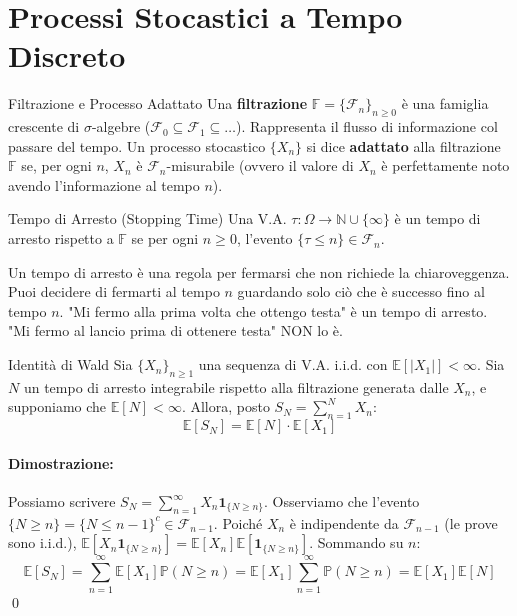 \documentclass[11pt,a4paper]{article}
\begin{document}
\newpage
\section{Processi Stocastici a Tempo Discreto}

\begin{definizione}{Filtrazione e Processo Adattato}{}
Una \textbf{filtrazione} $\mathbb{F} = \{\mathcal{F}_n\}_{n \ge 0}$ è una famiglia crescente di $\sigma$-algebre ($\mathcal{F}_0 \subseteq \mathcal{F}_1 \subseteq \dots$). Rappresenta il flusso di informazione col passare del tempo.
Un processo stocastico $\{X_n\}$ si dice \textbf{adattato} alla filtrazione $\mathbb{F}$ se, per ogni $n$, $X_n$ è $\mathcal{F}_n$-misurabile (ovvero il valore di $X_n$ è perfettamente noto avendo l'informazione al tempo $n$).
\end{definizione}

\begin{definizione}{Tempo di Arresto (Stopping Time)}{}
Una V.A. $\tau: \Omega \to \mathbb{N} \cup \{\infty\}$ è un tempo di arresto rispetto a $\mathbb{F}$ se per ogni $n \ge 0$, l'evento $\{\tau \le n\} \in \mathcal{F}_n$.
\end{definizione}
\begin{intuizione}
Un tempo di arresto è una regola per fermarsi che non richiede la chiaroveggenza. Puoi decidere di fermarti al tempo $n$ guardando solo ciò che è successo fino al tempo $n$. "Mi fermo alla prima volta che ottengo testa" è un tempo di arresto. "Mi fermo al lancio prima di ottenere testa" NON lo è.
\end{intuizione}

\begin{teorema}{Identità di Wald}{}
Sia $\{X_n\}_{n \ge 1}$ una sequenza di V.A. i.i.d. con $\mathbb{E}[|X_1|] < \infty$. Sia $N$ un tempo di arresto integrabile rispetto alla filtrazione generata dalle $X_n$, e supponiamo che $\mathbb{E}[N] < \infty$. Allora, posto $S_N = \sum_{n=1}^N X_n$:
\[ \mathbb{E}[S_N] = \mathbb{E}[N] \cdot \mathbb{E}[X_1] \]
\end{teorema}
\paragraph{Dimostrazione:}
Possiamo scrivere $S_N = \sum_{n=1}^\infty X_n \mathbf{1}_{\{N \ge n\}}$. Osserviamo che l'evento $\{N \ge n\} = \{N \le n-1\}^c \in \mathcal{F}_{n-1}$. Poiché $X_n$ è indipendente da $\mathcal{F}_{n-1}$ (le prove sono i.i.d.), $\mathbb{E}[X_n \mathbf{1}_{\{N \ge n\}}] = \mathbb{E}[X_n]\mathbb{E}[\mathbf{1}_{\{N \ge n\}}]$.
Sommando su $n$:
\[ \mathbb{E}[S_N] = \sum_{n=1}^\infty \mathbb{E}[X_1]\mathbb{P}(N \ge n) = \mathbb{E}[X_1] \sum_{n=1}^\infty \mathbb{P}(N \ge n) = \mathbb{E}[X_1]\mathbb{E}[N] \]
\qed
\end{document}
